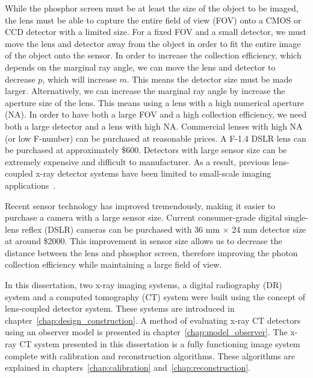 While the phosphor screen must be at least the size of the object to be imaged, the lens must be able to capture the entire field of view (FOV) onto a CMOS or CCD detector with a limited size.  For a fixed FOV and a small detector, we must move the lens and detector away from the object in order to fit the entire image of the object onto the sensor.  In order to increase the collection efficiency, which depends on the marginal ray angle, we can move the lens and detector to decrease $p$, which will increase $m$.  This means the detector size must be made larger.  Alternatively, we can increase the marginal ray angle by increase the aperture size of the lens.  This means using a lens with a high numerical aperture (NA).  In order to have both a large FOV and a high collection efficiency, we need both a large detector and a lens with high NA.  Commercial lenses with high NA (or low F-number) can be purchased at reasonable prices.  A F-1.4 DSLR lens can be purchased at approximately $\$600$.  Detectors with large sensor size can be extremely expensive and difficult to manufacturer.  As a result, previous lens-coupled x-ray detector systems have been limited to small-scale imaging applications~\citep{lee2001, kim2005, tate2005, madden2006}.  

Recent sensor technology has improved tremendously, making it easier to purchase a camera with a large sensor size.  Current consumer-grade digital single-lens reflex (DSLR) cameras can be purchased with 36 mm $\times$ 24 mm detector size at around \$2000.  This improvement in sensor size allows us to decrease the distance between the lens and phosphor screen, therefore improving the photon collection efficiency while maintaining a large field of view.

In this dissertation, two x-ray imaging systems, a digital radiography (DR) system and a computed tomography (CT) system were built using the concept of lens-coupled detector system.  These systems are introduced in chapter~\ref{chap:design_construction}.  A method of evaluating x-ray CT detectors using an observer model is presented in chapter~\ref{chap:model_observer}.   The x-ray CT system presented in this dissertation is a fully functioning image system complete with calibration and reconstruction algorithms.  These algorithms are explained in chapters~\ref{chap:calibration} and~\ref{chap:reconstruction}.







































